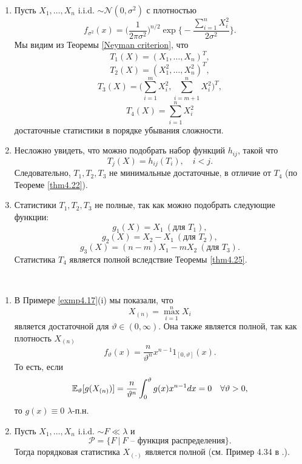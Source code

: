 \begin{exmp} \
	\begin{enumerate}
		\item Пусть $X_1, \dots , X_n$ i.i.d. $\sim \mathcal{N}(0, \sigma^2)$ с плотностью
		\[ f_{\sigma^2}(x) = \Big( \frac{1}{2 \pi \sigma^2} \Big)^{n/2} \exp \bigg \{  -\frac{\sum_{i=1}^{n}X_i^2}{2\sigma^2} \bigg \}. \]
		Мы видим из Теоремы \ref{Neyman criterion}, что
		\[ T_1(X) = (X_1, \dots, X_n)^T, \]
		\[ T_2(X) = (X_1^2, \dots, X_n^2)^T, \]
		\[ T_3(X) = \Big(\sum_{i=1}^{m}X_i^2, \sum_{i=m+1}^{n}X_i^2\Big)^T, \]
		\[ T_4(X) = \sum_{i=1}^{n}X_i^2 \]
		достаточные статистики в порядке убывания сложности.
		\item Несложно увидеть, что можно подобрать набор функций $h_{ij}$, такой что
		\[ T_j(X) = h_{ij}(T_i), \quad i < j. \]
		Следовательно, $T_1, T_2, T_3$ не минимальные достаточные, в отличие от $T_4$ (по Теореме \ref{thm4.22}).
		\item Статистики $T_1, T_2, T_3$ не полные, так как можно подобрать следующие функции:
		\[ g_1(X) = X_1\ (\text{для } T_1), \]
		\[ g_2(X) = X_2 - X_1\ (\text{для } T_2), \]
		\[ g_3(X) = (n - m)X_1 - m X_2\ (\text{для } T_3). \]
		Статистика $T_4$ является полной вследствие Теоремы \ref{thm4.25}.
	\end{enumerate}
\end{exmp}

\begin{exmp} \
	\begin{enumerate}
		\item В Примере \ref{exmp4.17}(i) мы показали, что
		\[ X_{(n)} = \max_{i=1}^n X_i \]
		является достаточной для $\vartheta \in (0, \infty)$. Она также является полной, так как плотность $X_{(n)}$
		\[ f_\vartheta(x) = \frac{n}{\vartheta^n}x^{n-1}1_{[0, \vartheta]}(x). \]
		То есть, если
		\[ \mathbb{E}_\vartheta[g(X_{(n)})] = \frac{n}{\vartheta^n} \int_0^\vartheta g(x)x^{n-1}dx = 0 \quad \forall \vartheta > 0, \]
		то $g(x) \equiv 0$ $\lambda$-п.н.
		\item Пусть $X_1, \dots, X_n$ i.i.d. $\sim F \ll \lambda$ и 
		\[ \mathcal{P} = \{ F\ |\ F \text{ -- функция распределения} \}. \]
		Тогда порядковая статистика $X_{(\cdot)}$ является полной (см. Пример 4.34 в \cite{LehmannRomano}.).
	\end{enumerate}
\end{exmp}

